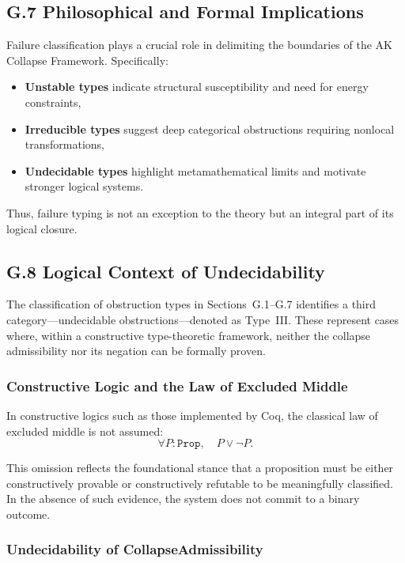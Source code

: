 \documentclass[11pt]{article}
\begin{document}
\subsection{G.7 Philosophical and Formal Implications}

Failure classification plays a crucial role in delimiting the boundaries of the AK Collapse Framework. Specifically:

\begin{itemize}
  \item \textbf{Unstable types} indicate structural susceptibility and need for energy constraints,
  \item \textbf{Irreducible types} suggest deep categorical obstructions requiring nonlocal transformations,
  \item \textbf{Undecidable types} highlight metamathematical limits and motivate stronger logical systems.
\end{itemize}

Thus, failure typing is not an exception to the theory but an integral part of its logical closure.

\subsection*{G.8 Logical Context of Undecidability}
\label{sec:undecidability-logical-context}

The classification of obstruction types in Sections~G.1--G.7 identifies a third category—undecidable obstructions—denoted as Type~III. These represent cases where, within a constructive type-theoretic framework, neither the collapse admissibility nor its negation can be formally proven.

\subsubsection*{Constructive Logic and the Law of Excluded Middle}

In constructive logics such as those implemented by Coq, the classical law of excluded middle is not assumed:
\[
\forall P : \texttt{Prop}, \quad P \vee \neg P.
\]

This omission reflects the foundational stance that a proposition must be either constructively provable or constructively refutable to be meaningfully classified. In the absence of such evidence, the system does not commit to a binary outcome.

\subsubsection*{Undecidability of CollapseAdmissibility}
\end{document}
